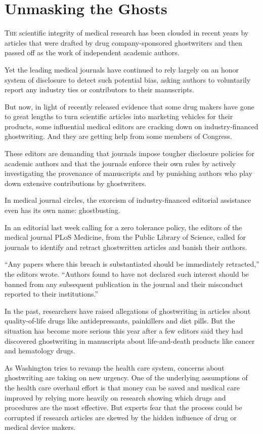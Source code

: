 ﻿\documentclass[12pt]{article}
\begin{document}
\section{Unmasking the Ghosts}

\lettrine{T}{he} scientific integrity of medical research has been clouded in recent years by
articles that were drafted by drug company-sponsored ghostwriters and then passed off as the work of
independent academic authors.

Yet the leading medical journals have continued to rely largely on an honor system of disclosure to
detect such potential bias, asking authors to voluntarily report any industry ties or contributors
to their manuscripts.

But now, in light of recently released evidence that some drug makers have gone to great lengths to
turn scientific articles into marketing vehicles for their products, some influential medical
editors are cracking down on industry-financed ghostwriting. And they are getting help from some
members of Congress.

These editors are demanding that journals impose tougher disclosure policies for academic authors
and that the journals enforce their own rules by actively investigating the provenance of
manuscripts and by punishing authors who play down extensive contributions by ghostwriters.

In medical journal circles, the exorcism of industry-financed editorial assistance even has its own
name: ghostbusting.

In an editorial last week calling for a zero tolerance policy, the editors of the medical journal
PLoS Medicine, from the Public Library of Science, called for journals to identify and retract
ghostwritten articles and banish their authors.

``Any papers where this breach is substantiated should be immediately retracted,'' the editors
wrote. ``Authors found to have not declared such interest should be banned from any subsequent
publication in the journal and their misconduct reported to their institutions.''

In the past, researchers have raised allegations of ghostwriting in articles about quality-of-life
drugs like antidepressants, painkillers and diet pills. But the situation has become more serious
this year after a few editors said they had discovered ghostwriting in manuscripts about
life-and-death products like cancer and hematology drugs.

As Washington tries to revamp the health care system, concerns about ghostwriting are taking on new
urgency. One of the underlying assumptions of the health care overhaul effort is that money can be
saved and medical care improved by relying more heavily on research showing which drugs and
procedures are the most effective. But experts fear that the process could be corrupted if research
articles are skewed by the hidden influence of drug or medical device makers.
\end{document}
